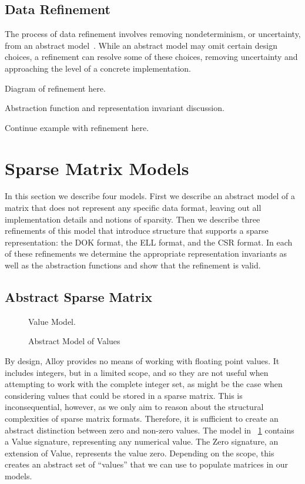 \documentclass[11pt,conference]{IEEEtran}
\begin{document}
\subsection{Data Refinement}

The process of data refinement involves removing nondeterminism, or uncertainty, from an abstract model~\cite{woodcock1996}.  While an abstract model may omit certain design choices, a refinement can resolve some of these choices, removing uncertainty and approaching the level of a concrete implementation.

Diagram of refinement here.

Abstraction function and representation invariant discussion.

Continue example with refinement here.

\section{Sparse Matrix Models}

In this section we describe four models.  First we describe an abstract model of a matrix that does not represent any specific data format, leaving out all implementation details and notions of sparsity. Then we describe three refinements of this model that introduce structure that supports a sparse representation: the DOK format, the ELL format, and the CSR format.  In each of these refinements we determine the appropriate representation invariants as well as the abstraction functions and show that the refinement is valid.

\subsection{Abstract Sparse Matrix}

\begin{figure}
\centering
Value Model.
\caption{Abstract Model of Values}
\label{mod:value}
\end{figure}

By design, Alloy provides no means of working with floating point values.  It includes integers, but in a limited scope, and so they are not useful when attempting to work with the complete integer set, as might be the case when considering values that could be stored in a sparse matrix.  This is inconsequential, however, as we only aim to reason about the structural complexities of sparse matrix formats.  Therefore, it is sufficient to create an abstract distinction between zero and non-zero values.  The model in \figurename~\ref{mod:value} contains a Value signature, representing any numerical value.  The Zero signature, an extension of Value, represents the value zero.  Depending on the scope, this creates an abstract set of ``values'' that we can use to populate matrices in our models.
\end{document}
